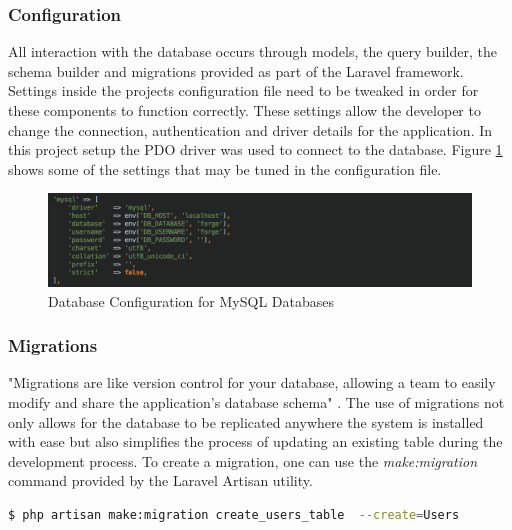\subsubsection{Configuration}
All interaction with the database occurs through models, the query builder, the schema builder and migrations provided as part of the Laravel framework. Settings inside the projects configuration file need to be tweaked in order for these components to function correctly. These settings allow the developer to change the connection, authentication and driver details for the application. In this project setup the PDO driver was used to connect to the database. Figure \ref{fig:Database_Config} shows some of the settings that may be tuned in the configuration file.

\begin{figure}[H]
	\centering
	\includegraphics[width=1.0\textwidth]{images/Code/Database_Config}
	\caption{Database Configuration for MySQL Databases} \label{fig:Database_Config}
\end{figure}

\subsubsection{Migrations}
"Migrations are like version control for your database, allowing a team to easily modify and share the application's database schema" \cite{Laravel:Migrations}. The use of migrations not only allows for the database to be replicated anywhere the system is installed with ease but also simplifies the process of updating an existing table during the development process.  To create a migration, one can use the \emph{make:migration} command provided by the Laravel Artisan utility.

\begin{lstlisting}[language=bash]
	$ php artisan make:migration create_users_table  --create=Users
\end{lstlisting}


